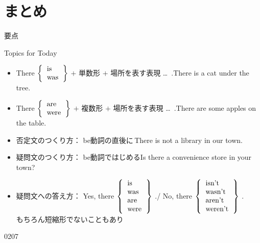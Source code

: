 \documentclass[aspectratio=169,xcolor={dvipsnames,table}]{beamer}
\newcommand{\myaudio}[1]{\href{#1}{\faVolumeUp}}
\begin{document}
\section{まとめ}
\begin{frame}[plain]{要点}

\begin{exampleblock}{Topics for Today}
 \begin{itemize}[square]\small
 \item There $\left\{
              \begin{tabular}{l}
              {is}\\
              {was}
              \end{tabular}
\right\}$ $+$ 単数形 $+$ 場所を表す表現 \ldots\,\,\,.\hfill{\scriptsize There is a cat under the tree.}
 \item There $\left\{
              \begin{tabular}{l}
              {are}\\
              {were}
              \end{tabular}
\right\}$ $+$ 複数形 $+$ 場所を表す表現 \ldots\,\,\,.\hfill{\scriptsize There are some apples on the table.}
 \item 否定文のつくり方： be動詞の直後に\,\hfill{}{\scriptsize There is not a library in our town.}
  \item 疑問文のつくり方： be動詞ではじめる\hfill{}{\scriptsize Is there a convenience store in your town?}
  \item 疑問文への答え方： Yes, there $\left\{
              \begin{tabular}{l}
              is\\
              was\\
              {are}\\
              {were}
              \end{tabular}
\right\}$ .\hfill{}/\hfill
No, there $\left\{
              \begin{tabular}{l}
              isn't\\
              wasn't\\
              {aren't}\\
              {weren't}
              \end{tabular}
\right\}$ .\hfill{}\mbox{}\\
\hfill{}{\scriptsize もちろん短縮形でないこともあり}
\end{itemize}
\end{exampleblock}
\hfill{\tiny 0207}\,{\scriptsize \myaudio{./audio/001_there_is_14.mp3}}
\end{frame}
\end{document}
